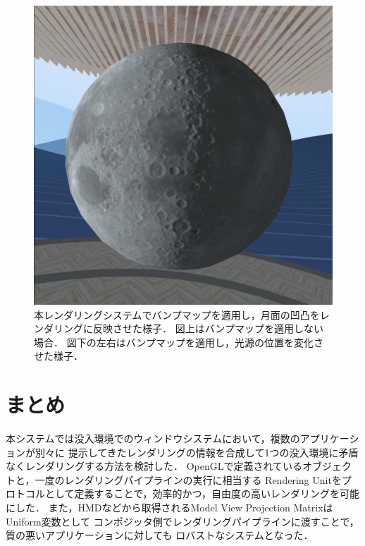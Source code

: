 \begin{figure}[htbp]
\begin{minipage}[t]{0.49\linewidth}
    \includegraphics[keepaspectratio, width=\linewidth]{figures/bump-map1.jpg}
  \end{minipage}
  \caption{
    本レンダリングシステムでバンプマップを適用し，月面の凹凸をレンダリングに反映させた様子．
    図上はバンプマップを適用しない場合．
    図下の左右はバンプマップを適用し，光源の位置を変化させた様子．
  }
  \label{fig:bumpmap}
\end{figure}




\section{まとめ}


本システムでは没入環境でのウィンドウシステムにおいて，複数のアプリケーションが別々に
提示してきたレンダリングの情報を合成して1つの没入環境に矛盾なくレンダリングする方法を検討した．
OpenGLで定義されているオブジェクトと，一度のレンダリングパイプラインの実行に相当する
Rendering Unitをプロトコルとして定義することで，効率的かつ，自由度の高いレンダリングを可能にした．
また，HMDなどから取得されるModel View Projection MatrixはUniform変数として
コンポジッタ側でレンダリングパイプラインに渡すことで，質の悪いアプリケーションに対しても
ロバストなシステムとなった．

